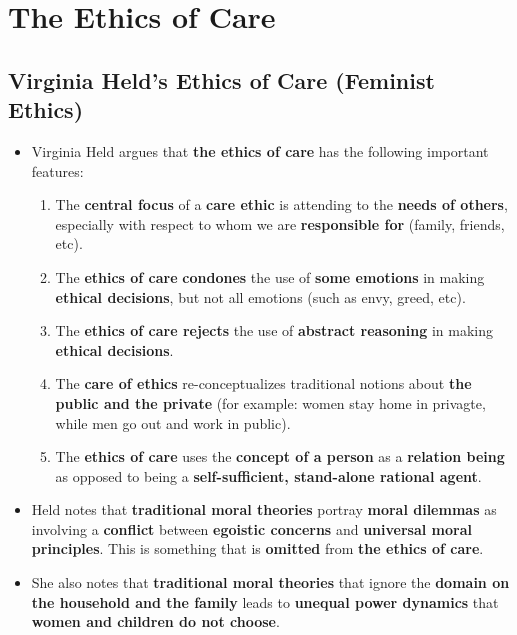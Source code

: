 \documentclass{article}
\begin{document}
    \section*{The Ethics of Care}

    \subsection*{Virginia Held's Ethics of Care (Feminist Ethics)}
    \begin{itemize}
        \item Virginia Held argues that \textbf{the ethics of care} has the following important features:
        \begin{enumerate}
            \item The \textbf{central focus} of a \textbf{care ethic} is attending to the \textbf{needs of others}, especially with respect to whom we are \textbf{responsible for} (family, friends, etc).
            \item The \textbf{ethics of care} \textbf{condones} the use of \textbf{some emotions} in making \textbf{ethical decisions}, but not all emotions (such as envy, greed, etc).
            \item The \textbf{ethics of care rejects} the use of \textbf{abstract reasoning} in making \textbf{ethical decisions}.
            \item The \textbf{care of ethics} re-conceptualizes traditional notions about \textbf{the public and the private} (for example: women stay home in privagte, while men go out and work in public).
            \item The \textbf{ethics of care} uses the \textbf{concept of a person} as a \textbf{relation being} as opposed to being a \textbf{self-sufficient, stand-alone rational agent}.
        \end{enumerate}
        \item Held notes that \textbf{traditional moral theories} portray \textbf{moral dilemmas} as involving a \textbf{conflict} between \textbf{egoistic concerns} and \textbf{universal moral principles}. This is something that is \textbf{omitted} from \textbf{the ethics of care}.
        \item She also notes that \textbf{traditional moral theories} that ignore the \textbf{domain on the household and the family} leads to \textbf{unequal power dynamics} that \textbf{women and children do not choose}.
    \end{itemize}
\end{document}
